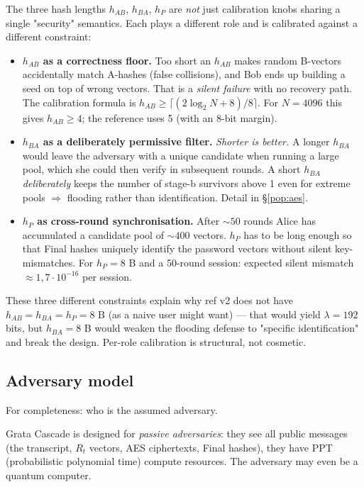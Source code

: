 \documentclass[11pt,a4paper]{article}
\begin{document}
The three hash lengths $h_{AB}$, $h_{BA}$, $h_P$ are \emph{not} just calibration knobs sharing a single "security" semantics. Each plays a different role and is calibrated against a different constraint:

\begin{itemize}[leftmargin=*]
\item \textbf{$h_{AB}$ as a correctness floor.} Too short an $h_{AB}$ makes random B-vectors accidentally match A-hashes (false collisions), and Bob ends up building a seed on top of wrong vectors. That is a \emph{silent failure} with no recovery path. The calibration formula is $h_{AB} \geq \lceil (2 \log_2 N + 8)/8 \rceil$. For $N = 4096$ this gives $h_{AB} \geq 4$; the reference uses 5 (with an 8-bit margin).

\item \textbf{$h_{BA}$ as a deliberately permissive filter.} \emph{Shorter is better.} A longer $h_{BA}$ would leave the adversary with a unique candidate when running a large pool, which she could then verify in subsequent rounds. A short $h_{BA}$ \emph{deliberately} keeps the number of stage-b survivors above 1 even for extreme pools $\Rightarrow$ flooding rather than identification. Detail in §\ref{pop:aes}.

\item \textbf{$h_P$ as cross-round synchronisation.} After $\sim 50$ rounds Alice has accumulated a candidate pool of $\sim 400$ vectors. $h_P$ has to be long enough so that Final hashes uniquely identify the password vectors without silent key-mismatches. For $h_P = 8$ B and a 50-round session: expected silent mismatch $\approx 1{,}7 \cdot 10^{-16}$ per session.
\end{itemize}

These three different constraints explain why ref v2 does not have $h_{AB} = h_{BA} = h_P = 8$ B (as a naive user might want) --- that would yield $\lambda = 192$ bits, but $h_{BA} = 8$ B would weaken the flooding defense to "specific identification" and break the design. Per-role calibration is structural, not cosmetic.

\subsection{Adversary model}

For completeness: who is the assumed adversary.

Grata Cascade is designed for \emph{passive adversaries}: they see all public messages (the transcript, $R_t$ vectors, AES ciphertexts, Final hashes), they have PPT (probabilistic polynomial time) compute resources. The adversary may even be a quantum computer.
\end{document}
